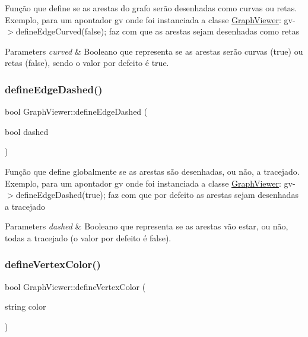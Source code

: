 Função que define se as arestas do grafo serão desenhadas como curvas ou retas. Exemplo, para um apontador gv onde foi instanciada a classe \mbox{\hyperlink{class_graph_viewer}{Graph\+Viewer}}\+: gv-\/$>$define\+Edge\+Curved(false); faz com que as arestas sejam desenhadas como retas


\begin{DoxyParams}{Parameters}
{\em curved} & Booleano que representa se as arestas serão curvas (true) ou retas (false), sendo o valor por defeito é true. \\
\hline
\end{DoxyParams}
\mbox{\label{class_graph_viewer_af785279b5c204df0e274b20c36276fc3}} 
\subsubsection{\texorpdfstring{define\+Edge\+Dashed()}{defineEdgeDashed()}}
{\footnotesize\ttfamily bool Graph\+Viewer\+::define\+Edge\+Dashed (\begin{DoxyParamCaption}\item[{bool}]{dashed }\end{DoxyParamCaption})}

Função que define globalmente se as arestas são desenhadas, ou não, a tracejado. Exemplo, para um apontador gv onde foi instanciada a classe \mbox{\hyperlink{class_graph_viewer}{Graph\+Viewer}}\+: gv-\/$>$define\+Edge\+Dashed(true); faz com que por defeito as arestas sejam desenhadas a tracejado


\begin{DoxyParams}{Parameters}
{\em dashed} & Booleano que representa se as arestas vão estar, ou não, todas a tracejado (o valor por defeito é false). \\
\hline
\end{DoxyParams}
\mbox{\label{class_graph_viewer_a76de8676b7a93d72af514b84cdaa4d21}} 
\subsubsection{\texorpdfstring{define\+Vertex\+Color()}{defineVertexColor()}}
{\footnotesize\ttfamily bool Graph\+Viewer\+::define\+Vertex\+Color (\begin{DoxyParamCaption}\item[{string}]{color }\end{DoxyParamCaption})}

